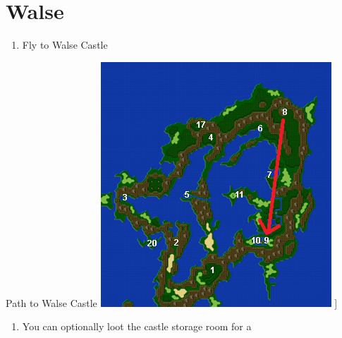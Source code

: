 \chapter{Walse}

\vspace{\baselineskip}

\begin{paracol}{2}

\begin{enumerate}
    \item Fly to Walse Castle
\end{enumerate}

\switchcolumn
\begin{misc}{Path to Walse Castle}
    \includegraphics[scale=0.6]{../Graphics/Maps/1. To Walse.png}
    ]
\end{misc}

\switchcolumn*
\newpage
\begin{enumerate}[resume]
    \item You can optionally loot the castle storage room for a 
\end{enumerate}


\end{paracol}

